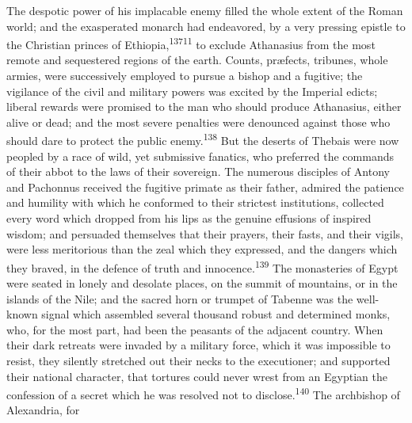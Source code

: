 

The despotic power of his implacable enemy filled the whole
extent of the Roman world; and the exasperated monarch had
endeavored, by a very pressing epistle to the Christian princes
of Ethiopia,\textsuperscript{13711} to exclude Athanasius from the most remote and
sequestered regions of the earth. Counts, præfects, tribunes,
whole armies, were successively employed to pursue a bishop and a
fugitive; the vigilance of the civil and military powers was
excited by the Imperial edicts; liberal rewards were promised to
the man who should produce Athanasius, either alive or dead; and
the most severe penalties were denounced against those who should
dare to protect the public enemy.\textsuperscript{138} But the deserts of Thebais
were now peopled by a race of wild, yet submissive fanatics, who
preferred the commands of their abbot to the laws of their
sovereign. The numerous disciples of Antony and Pachonnus
received the fugitive primate as their father, admired the
patience and humility with which he conformed to their strictest
institutions, collected every word which dropped from his lips as
the genuine effusions of inspired wisdom; and persuaded
themselves that their prayers, their fasts, and their vigils,
were less meritorious than the zeal which they expressed, and the
dangers which they braved, in the defence of truth and innocence.\textsuperscript{139}
The monasteries of Egypt were seated in lonely and desolate
places, on the summit of mountains, or in the islands of the
Nile; and the sacred horn or trumpet of Tabenne was the
well-known signal which assembled several thousand robust and
determined monks, who, for the most part, had been the peasants
of the adjacent country. When their dark retreats were invaded by
a military force, which it was impossible to resist, they
silently stretched out their necks to the executioner; and
supported their national character, that tortures could never
wrest from an Egyptian the confession of a secret which he was
resolved not to disclose.\textsuperscript{140} The archbishop of Alexandria, for
